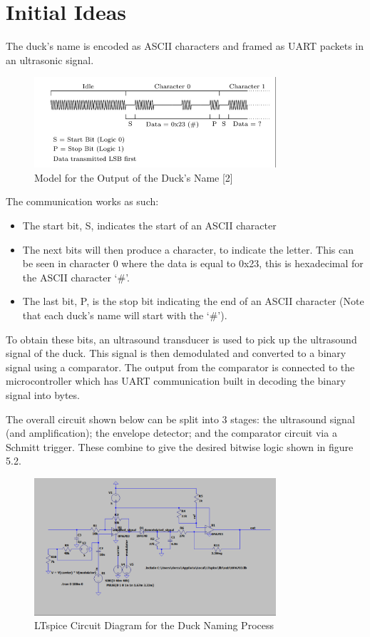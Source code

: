 \section{Initial Ideas}
The duck's name is encoded as ASCII characters and framed as UART packets in an ultrasonic signal.
\begin{figure}[h]
    \centering
    \includegraphics[width=0.8\textwidth]{subpages/images/ultra_spec.png}
    \caption{Model for the Output of the Duck's Name [2]}
    \label{fig:ultrasound_specifications}
\end{figure}

The communication works as such:
\begin{itemize}
    \item The start bit, S, indicates the start of an ASCII character
    \item The next bits will then produce a character, to indicate the letter. This can be seen in character 0 where the data is equal to 0x23, this is hexadecimal for the ASCII character `\#'.
    \item The last bit, P, is the stop bit indicating the end of an ASCII character (Note that each duck's name will start with the `\#').
\end{itemize}

To obtain these bits, an ultrasound transducer is used to pick up the ultrasound signal of the duck. This signal is then demodulated and converted to a binary signal using a comparator. The output from the comparator is connected to the microcontroller which has UART communication built in decoding the binary signal into bytes.

The overall circuit shown below can be split into 3 stages: the ultrasound signal (and amplification); the envelope detector; and the comparator circuit via a Schmitt trigger. These combine to give the desired bitwise logic shown in figure 5.2.
\begin{figure}[h]
    \centering
    \includegraphics[width=0.8\textwidth]{subpages/images/ultra_circuit_naming.png}
    \caption{LTspice Circuit Diagram for the Duck Naming Process}
    \label{fig:ultrasound_naming_circuit}
\end{figure}

